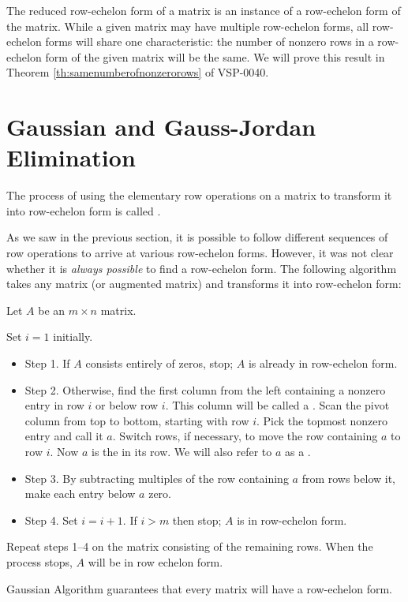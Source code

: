 \documentclass{ximera}
\begin{document}
The reduced row-echelon form of a matrix is an instance of a row-echelon form of the matrix.  While a given matrix may have multiple row-echelon forms, all row-echelon forms will share one characteristic: the number of nonzero rows in a row-echelon form of the given matrix will be the same.
We will prove this result in Theorem \ref{th:samenumberofnonzerorows} of VSP-0040.

\section*{Gaussian and Gauss-Jordan Elimination}

\begin{definition}\label{def:GaussianElimination}
The process of using the elementary row operations on a matrix to transform it into row-echelon form is called .
\end{definition}

As we saw in the previous section, it is possible to follow different sequences of row operations to arrive at various row-echelon forms.  However, it was not clear whether it is {\it always possible} to find a row-echelon form.  The following algorithm takes any matrix (or augmented matrix) and transforms it into row-echelon form:
\begin{algorithm} \label{alg:gaussian} 
Let $A$ be an $m\times n$ matrix.

Set $i=1$ initially.
\begin{itemize}
\item[] Step 1. If $A$ consists entirely of zeros, stop;  $A$ is already in row-echelon form.

\item[] Step 2. Otherwise, find the first column from the left containing a nonzero entry in row $i$ or below row $i$.  This column will be called a .  Scan the pivot column from top to bottom, starting with row $i$.  Pick the topmost nonzero entry and call it $a$.  Switch rows, if necessary, to move the row containing $a$ to row $i$.  Now $a$ is the  in its row.  We will also refer to $a$ as a .  

\item[] Step 3. By subtracting multiples of the row containing $a$ from rows below it, make each entry below $a$ zero.

\item[] Step 4.  Set $i=i+1$.  If $i>m$ then stop; $A$ is in row-echelon form.

\end{itemize}

Repeat steps 1--4 on the matrix consisting of the remaining rows.
When the process stops, $A$ will be in row echelon form.
\end{algorithm}
Gaussian Algorithm guarantees that every matrix will have a row-echelon form.  
\end{document}
